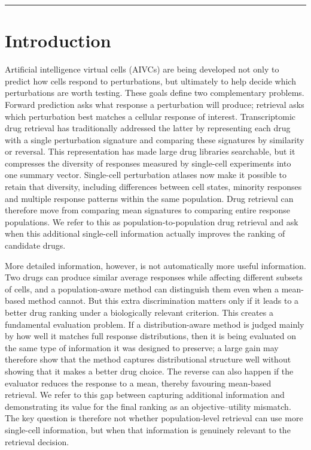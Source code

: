 \documentclass[11pt,letterpaper]{article}
\begin{document}
\bigskip\noindent\rule{\textwidth}{0.4pt}\bigskip

\section*{Introduction}

Artificial intelligence virtual cells (AIVCs)\cite{AIVirtualCell,VirtualCellChallenge} are being developed not only to predict how cells respond to perturbations\cite{ref7,ref8,ref9}, but ultimately to help decide which perturbations are worth testing. These goals define two complementary problems. Forward prediction asks what response a perturbation will produce\cite{ref4,ref5,ref6,ref10,ref12}; retrieval asks which perturbation best matches a cellular response of interest. Transcriptomic drug retrieval has traditionally addressed the latter by representing each drug with a single perturbation signature and comparing these signatures by similarity or reversal\cite{ref1,ref2,ref11}. This representation has made large drug libraries searchable, but it compresses the diversity of responses measured by single-cell experiments into one summary vector. Single-cell perturbation atlases now make it possible to retain that diversity\cite{ref3,dataSciPlex3,Tahoe100M}, including differences between cell states\cite{dataZhao}, minority responses\cite{RareCellVariability} and multiple response patterns within the same population. Drug retrieval can therefore move from comparing mean signatures to comparing entire response populations. We refer to this as population-to-population drug retrieval and ask when this additional single-cell information actually improves the ranking of candidate drugs.

More detailed information, however, is not automatically more useful information. Two drugs can produce similar average responses while affecting different subsets of cells, and a population-aware method can distinguish them even when a mean-based method cannot. But this extra discrimination matters only if it leads to a better drug ranking under a biologically relevant criterion. This creates a fundamental evaluation problem\cite{ref15,ref16,MetricGaming}. If a distribution-aware method\cite{CellOT,CellFlow,Departures} is judged mainly by how well it matches full response distributions\cite{OptimalMetrics,StandardizedEval}, then it is being evaluated on the same type of information it was designed to preserve; a large gain may therefore show that the method captures distributional structure well without showing that it makes a better drug choice\cite{ref13,ref14}. The reverse can also happen if the evaluator reduces the response to a mean, thereby favouring mean-based retrieval\cite{ref17}. We refer to this gap between capturing additional information and demonstrating its value for the final ranking as an objective–utility mismatch. The key question is therefore not whether population-level retrieval can use more single-cell information, but when that information is genuinely relevant to the retrieval decision.
\end{document}
